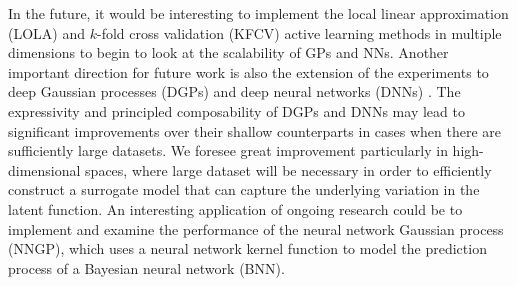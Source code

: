 \documentclass[conference]{IEEEtran}
\begin{document}
	In the future, it would be interesting to implement the local linear approximation (LOLA) and $k$-fold cross validation (KFCV) active learning methods in multiple dimensions to begin to look at the scalability of GPs and NNs. Another important direction for future work is also the extension of the experiments to deep Gaussian processes (DGPs) and deep neural networks (DNNs) \cite{Damianou2013DeepProcesses}. The expressivity and principled composability of DGPs and DNNs may lead to significant improvements over their shallow counterparts in cases when there are sufficiently large datasets. We foresee great improvement particularly in high-dimensional spaces, where large dataset will be necessary in order to efficiently construct a surrogate model that can capture the underlying variation in the latent function. An interesting application of ongoing research could be to implement and examine the performance of the neural network Gaussian process (NNGP), which uses a neural network kernel function to model the prediction process of a Bayesian neural network (BNN).
	
	
	
	
	
\end{document}
